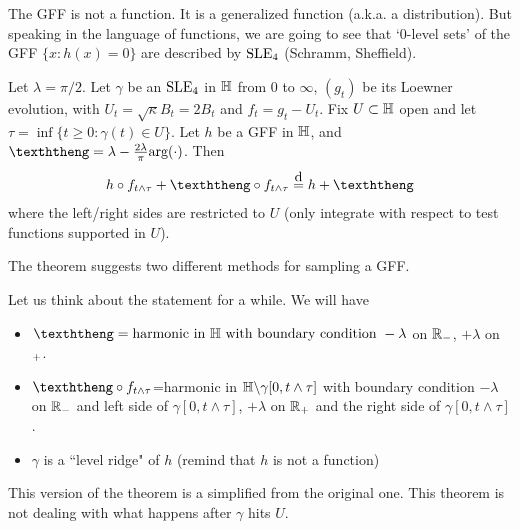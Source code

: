 \documentclass[12pt,a4paper]{article}
\newcommand\xeq{\stackrel{\mathclap{\normalfont\mbox{d}}}{=}}
\begin{document}
The GFF is not a function. It is a generalized function (a.k.a. a distribution). But speaking in the language of functions, we are going to see that `0-level sets' of the GFF $\{x: h(x) =0\}$ are described by $\text{SLE}_{4}$ (Schramm, Sheffield).
\s

\thm Let $\lambda = \pi/2$. Let $\gamma$ be an $\text{SLE}_{4}$ in $\mathbb{H}$ from $0$ to $\infty$, $(g_t)$ be its Loewner evolution, with $U_t =\sqrt{\kappa} B_t = 2B_t$ and $f_t = g_t - U_t$. Fix $U\subset \mathbb{H}$ open and let $\tau =\inf \{ t\geq 0 : \gamma(t) \in U \}$. Let $h$ be a GFF in $\mathbb{H}$, and $\hh = \lambda - \frac{2\lambda}{\pi} \text{arg}(\cdot)$. Then
\begin{align*}
h\circ f_{t\wedge \tau} + \hh \circ f_{t\wedge \tau} \xeq h + \hh
\end{align*}
where the left/right sides are restricted to $U$ (only integrate with respect to test functions supported in $U$).
\s

The theorem suggests two different methods for sampling a GFF.

\quad Let us think about the statement for a while. We will have
\begin{itemize}
\item $\hh = \text{harmonic in } \H\text{ with boundary condition }-\lambda$ on $\mathbb{R}_-$, $+\lambda$ on $\real_+$.
\item $\hh \circ f_{t\wedge \tau}$=harmonic in $\mathbb{H} \backslash \gamma[0, t\wedge \tau]$ with boundary condition $-\lambda$  on $\mathbb{R}_-$ and left side of $\gamma[0, t\wedge \tau]$, $+ \lambda$ on $\mathbb{R}_+$ and the right side of $\gamma[0, t\wedge \tau]$.
\item $\gamma$ is a ``level ridge" of $h$ (remind that $h$ is not a function)
\end{itemize}
This version of the theorem is a simplified from the original one. This theorem is not dealing with what happens after $\gamma$ hits $U$.
\s
\end{document}
